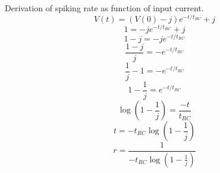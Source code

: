Derivation of spiking rate as function of input current.
\[
  V(t) = (V(0) - j)e^{-t/t_{RC}} + j
\]
$$
  1 = - je^{-t/t_{RC}} + j
$$
$$
  1 - j = - je^{-t/t_{RC}}
$$
$$
  \frac{1 - j}{j} = - e^{-t/t_{RC}}
$$
$$
  \frac{1}{j} - 1 = - e^{-t/t_{RC}}
$$
$$
  1 -\frac{1}{j} = e^{-t/t_{RC}}
$$
$$
  \log(1 -\frac{1}{j}) = \frac{-t}{t_{RC}}
$$
$$
  t = -t_{RC}\log(1 -\frac{1}{j})
$$
$$
  r = \frac{1}{-t_{RC}\log(1 -\frac{1}{j})}
$$
\cite{hunsberger2015spiking}